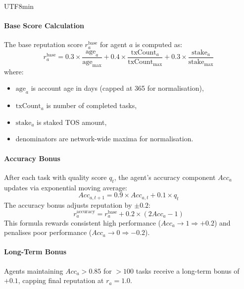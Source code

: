 \documentclass[11pt]{article}
\begin{document}
\begin{CJK}{UTF8}{min}
\paragraph{Base Score Calculation} The base reputation score $r_a^{\text{base}}$ for agent $a$ is computed as:
\begin{equation}
r_a^{\text{base}} = 0.3 \times \frac{\text{age}_a}{\text{age}_{\max}} + 0.4 \times \frac{\text{txCount}_a}{\text{txCount}_{\max}} + 0.3 \times \frac{\text{stake}_a}{\text{stake}_{\max}}
\end{equation}
where:
\begin{itemize}[noitemsep]
  \item $\text{age}_a$ is account age in days (capped at 365 for normalisation),
  \item $\text{txCount}_a$ is number of completed tasks,
  \item $\text{stake}_a$ is staked TOS amount,
  \item denominators are network-wide maxima for normalisation.
\end{itemize}

\paragraph{Accuracy Bonus} After each task with quality score $q_t$, the agent's accuracy component $Acc_a$ updates via exponential moving average:
\begin{equation}
Acc_{a,t+1} = 0.9 \times Acc_{a,t} + 0.1 \times q_t
\end{equation}
The accuracy bonus adjusts reputation by $\pm 0.2$:
\begin{equation}
r_a^{\text{accuracy}} = r_a^{\text{base}} + 0.2 \times (2 Acc_a - 1)
\end{equation}
This formula rewards consistent high performance ($Acc_a \to 1 \Rightarrow +0.2$) and penalises poor performance ($Acc_a \to 0 \Rightarrow -0.2$).

\paragraph{Long-Term Bonus} Agents maintaining $Acc_a > 0.85$ for $>100$ tasks receive a long-term bonus of $+0.1$, capping final reputation at $r_a = 1.0$.


\end{CJK}
\end{document}
